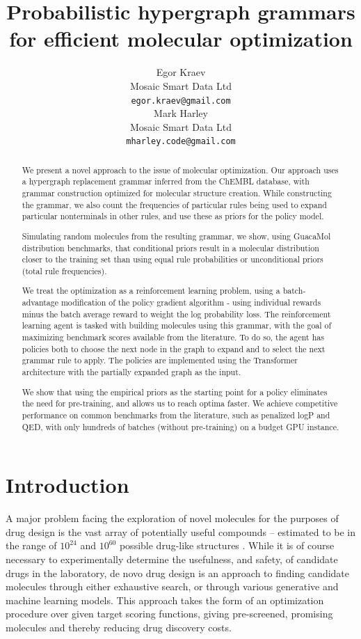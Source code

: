 \documentclass{article}
\title{Probabilistic hypergraph grammars for efficient molecular optimization}
\author{%
  Egor Kraev \\
  Mosaic Smart Data Ltd \\
  \texttt{egor.kraev@gmail.com} \\
  \And
  Mark Harley \\
  Mosaic Smart Data Ltd \\
  \texttt{mharley.code@gmail.com}
}
\begin{document}
\maketitle

\begin{abstract}
We present a novel approach to the issue of molecular optimization. Our approach uses a hypergraph replacement grammar inferred from the ChEMBL database, with grammar construction optimized for molecular structure creation. While constructing the grammar, we also count the frequencies of particular rules being used to expand particular nonterminals in other rules, and use these as priors for the policy model.

Simulating random molecules from the resulting grammar, we show, using GuacaMol distribution benchmarks, that conditional priors result in a molecular distribution closer to the training set than using equal rule probabilities or unconditional priors (total rule frequencies). 

We treat the optimization as a reinforcement learning problem, using a batch-advantage modification of the policy gradient algorithm - using individual rewards minus the batch average reward to weight the log probability loss. The reinforcement learning agent is tasked with building molecules using this grammar, with the goal of maximizing benchmark scores available from the literature. To do so, the agent has policies both to choose the next node in the graph to expand and to select the next grammar rule to apply. The policies are implemented using the Transformer architecture with the partially expanded graph as the input.

We show that using the empirical priors as the starting point for a policy eliminates the need for pre-training, and allows us to reach optima faster. We achieve competitive performance on common benchmarks from the literature, such as penalized logP and QED, with only hundreds of batches (without pre-training) on a budget GPU instance. 
\end{abstract}

\section{Introduction}\label{sec:intro}
A major problem facing the exploration of novel molecules for the purposes of drug design is the vast array of potentially useful compounds -- estimated to be in the range of $10^{24}$ and $10^{60}$ possible drug-like structures \cite{walters2019, ruddigkeit2012}. While it is of course necessary to experimentally determine the usefulness, and safety, of candidate drugs in the laboratory, de novo drug design is an approach to finding candidate molecules through either exhaustive search, or through various generative and machine learning models. This approach takes the form of an optimization procedure over given target scoring functions, giving pre-screened, promising molecules and thereby reducing drug discovery costs.
\end{document}
